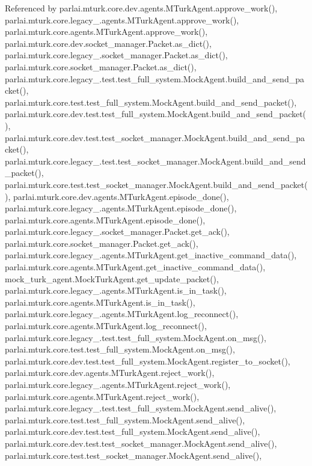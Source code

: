 Referenced by parlai.\+mturk.\+core.\+dev.\+agents.\+M\+Turk\+Agent.\+approve\+\_\+work(), parlai.\+mturk.\+core.\+legacy\+\_.\+agents.\+M\+Turk\+Agent.\+approve\+\_\+work(), parlai.\+mturk.\+core.\+agents.\+M\+Turk\+Agent.\+approve\+\_\+work(), parlai.\+mturk.\+core.\+dev.\+socket\+\_\+manager.\+Packet.\+as\+\_\+dict(), parlai.\+mturk.\+core.\+legacy\+\_.\+socket\+\_\+manager.\+Packet.\+as\+\_\+dict(), parlai.\+mturk.\+core.\+socket\+\_\+manager.\+Packet.\+as\+\_\+dict(), parlai.\+mturk.\+core.\+legacy\+\_.\+test.\+test\+\_\+full\+\_\+system.\+Mock\+Agent.\+build\+\_\+and\+\_\+send\+\_\+packet(), parlai.\+mturk.\+core.\+test.\+test\+\_\+full\+\_\+system.\+Mock\+Agent.\+build\+\_\+and\+\_\+send\+\_\+packet(), parlai.\+mturk.\+core.\+dev.\+test.\+test\+\_\+full\+\_\+system.\+Mock\+Agent.\+build\+\_\+and\+\_\+send\+\_\+packet(), parlai.\+mturk.\+core.\+dev.\+test.\+test\+\_\+socket\+\_\+manager.\+Mock\+Agent.\+build\+\_\+and\+\_\+send\+\_\+packet(), parlai.\+mturk.\+core.\+legacy\+\_.\+test.\+test\+\_\+socket\+\_\+manager.\+Mock\+Agent.\+build\+\_\+and\+\_\+send\+\_\+packet(), parlai.\+mturk.\+core.\+test.\+test\+\_\+socket\+\_\+manager.\+Mock\+Agent.\+build\+\_\+and\+\_\+send\+\_\+packet(), parlai.\+mturk.\+core.\+dev.\+agents.\+M\+Turk\+Agent.\+episode\+\_\+done(), parlai.\+mturk.\+core.\+legacy\+\_.\+agents.\+M\+Turk\+Agent.\+episode\+\_\+done(), parlai.\+mturk.\+core.\+agents.\+M\+Turk\+Agent.\+episode\+\_\+done(), parlai.\+mturk.\+core.\+legacy\+\_.\+socket\+\_\+manager.\+Packet.\+get\+\_\+ack(), parlai.\+mturk.\+core.\+socket\+\_\+manager.\+Packet.\+get\+\_\+ack(), parlai.\+mturk.\+core.\+legacy\+\_.\+agents.\+M\+Turk\+Agent.\+get\+\_\+inactive\+\_\+command\+\_\+data(), parlai.\+mturk.\+core.\+agents.\+M\+Turk\+Agent.\+get\+\_\+inactive\+\_\+command\+\_\+data(), mock\+\_\+turk\+\_\+agent.\+Mock\+Turk\+Agent.\+get\+\_\+update\+\_\+packet(), parlai.\+mturk.\+core.\+legacy\+\_.\+agents.\+M\+Turk\+Agent.\+is\+\_\+in\+\_\+task(), parlai.\+mturk.\+core.\+agents.\+M\+Turk\+Agent.\+is\+\_\+in\+\_\+task(), parlai.\+mturk.\+core.\+legacy\+\_.\+agents.\+M\+Turk\+Agent.\+log\+\_\+reconnect(), parlai.\+mturk.\+core.\+agents.\+M\+Turk\+Agent.\+log\+\_\+reconnect(), parlai.\+mturk.\+core.\+legacy\+\_.\+test.\+test\+\_\+full\+\_\+system.\+Mock\+Agent.\+on\+\_\+msg(), parlai.\+mturk.\+core.\+test.\+test\+\_\+full\+\_\+system.\+Mock\+Agent.\+on\+\_\+msg(), parlai.\+mturk.\+core.\+dev.\+test.\+test\+\_\+full\+\_\+system.\+Mock\+Agent.\+register\+\_\+to\+\_\+socket(), parlai.\+mturk.\+core.\+dev.\+agents.\+M\+Turk\+Agent.\+reject\+\_\+work(), parlai.\+mturk.\+core.\+legacy\+\_.\+agents.\+M\+Turk\+Agent.\+reject\+\_\+work(), parlai.\+mturk.\+core.\+agents.\+M\+Turk\+Agent.\+reject\+\_\+work(), parlai.\+mturk.\+core.\+legacy\+\_.\+test.\+test\+\_\+full\+\_\+system.\+Mock\+Agent.\+send\+\_\+alive(), parlai.\+mturk.\+core.\+test.\+test\+\_\+full\+\_\+system.\+Mock\+Agent.\+send\+\_\+alive(), parlai.\+mturk.\+core.\+dev.\+test.\+test\+\_\+full\+\_\+system.\+Mock\+Agent.\+send\+\_\+alive(), parlai.\+mturk.\+core.\+dev.\+test.\+test\+\_\+socket\+\_\+manager.\+Mock\+Agent.\+send\+\_\+alive(), parlai.\+mturk.\+core.\+test.\+test\+\_\+socket\+\_\+manager.\+Mock\+Agent.\+send\+\_\+alive(), 